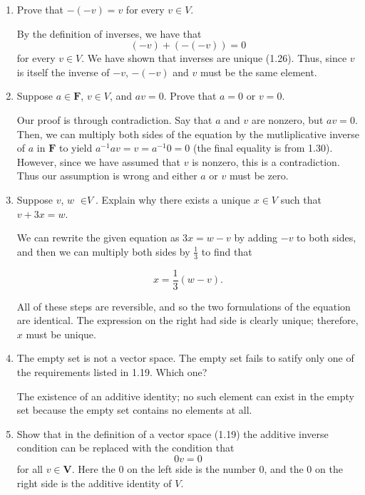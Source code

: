 \documentclass{book}
\begin{document}
\begin{enumerate}

\item Prove that \(-(-v)=v\) for every \(v \in V\).

By the definition of inverses, we have that \[(-v)+(-(-v))=0\] for every \(v \in V\).  We have shown that inverses are unique (1.26).  Thus, since \(v\) is itself the inverse of \(-v\), \(-(-v)\) and \(v\) must be the same element.

\item Suppose \(a \in \textbf{F}\), \(v \in V\), and \(av=0\).  Prove that \(a=0\) or \(v=0\).

Our proof is through contradiction.  Say that \(a\) and \(v\) are nonzero, but \(av=0\).  Then, we can multiply both sides of the equation by the mutliplicative inverse of \(a\) in \(\textbf{F}\) to yield \(a^{-1}av=v=a^{-1}0=0\) (the final equality is from 1.30).  However, since we have assumed that \(v\) is nonzero, this is a contradiction.  Thus our assumption is wrong and either \(a\) or \(v\) must be zero.

\item Suppose \(v\), \(w\) \(\in \textit{V}\).  Explain why there exists a unique \(x \in V\) such that \(v+3x=w\).

We can rewrite the given equation as \(3x=w-v\) by adding \(-v\) to both sides, and then we can multiply both sides by \(\frac{1}{3}\) to find that

\begin{equation*}
    x=\frac{1}{3}(w-v).
\end{equation*}

All of these steps are reversible, and so the two formulations of the equation are identical.  The expression on the right had side is clearly unique; therefore, \(x\) must be unique.

\item The empty set is not a vector space.  The empty set fails to satify only one of the requirements listed in 1.19.  Which one?

The existence of an additive identity; no such element can exist in the empty set because the empty set contains no elements at all.

\item Show that in the definition of a vector space (1.19) the additive inverse condition can be replaced with the condition that \[0v=0\] for all \(v \in \textbf{V}\).  Here the 0 on the left side is the number 0, and the 0 on the right side is the additive identity of \(V\).


\end{enumerate}
\end{document}
